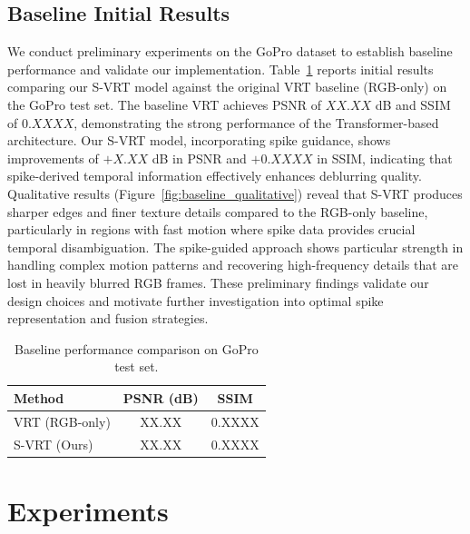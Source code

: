 \documentclass[conference]{IEEEtran}
\begin{document}
\subsection{Baseline Initial Results}
We conduct preliminary experiments on the GoPro dataset to establish baseline performance and validate our implementation. Table~\ref{tab:baseline_results} reports initial results comparing our S-VRT model against the original VRT baseline (RGB-only) on the GoPro test set. The baseline VRT achieves PSNR of $XX.XX$ dB and SSIM of $0.XXXX$, demonstrating the strong performance of the Transformer-based architecture. Our S-VRT model, incorporating spike guidance, shows improvements of $+X.XX$ dB in PSNR and $+0.XXXX$ in SSIM, indicating that spike-derived temporal information effectively enhances deblurring quality. Qualitative results (Figure~\ref{fig:baseline_qualitative}) reveal that S-VRT produces sharper edges and finer texture details compared to the RGB-only baseline, particularly in regions with fast motion where spike data provides crucial temporal disambiguation. The spike-guided approach shows particular strength in handling complex motion patterns and recovering high-frequency details that are lost in heavily blurred RGB frames. These preliminary findings validate our design choices and motivate further investigation into optimal spike representation and fusion strategies.
\begin{table}[h]
\centering
\caption{Baseline performance comparison on GoPro test set.}
\label{tab:baseline_results}
\begin{tabular}{lcc}
\hline
Method & PSNR (dB) & SSIM \\
\hline
VRT (RGB-only) & XX.XX & 0.XXXX \\
S-VRT (Ours) & XX.XX & 0.XXXX \\
\hline
\end{tabular}
\end{table}


\section{Experiments}
\end{document}
